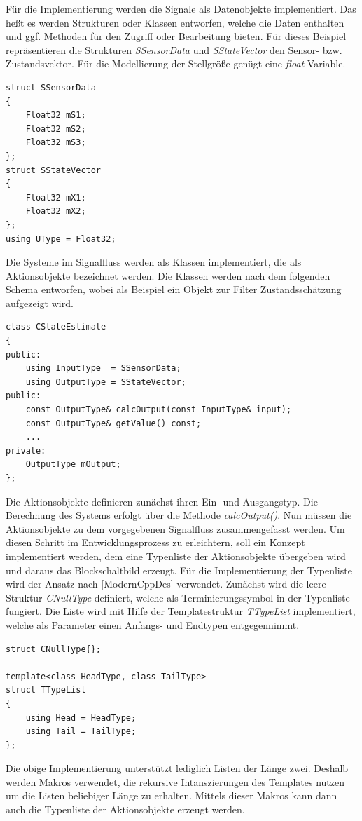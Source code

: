 Für die Implementierung werden die Signale als Datenobjekte implementiert. Das heßt es werden Strukturen oder Klassen entworfen, welche die Daten enthalten und ggf. Methoden für den Zugriff oder Bearbeitung bieten. Für dieses Beispiel repräsentieren die Strukturen \textit{SSensorData} und \textit{SStateVector} den Sensor- bzw. Zustandsvektor. Für die Modellierung der Stellgröße genügt eine \textit{float}-Variable.
\begin{lstlisting}[caption={Beispielhafte Implementierung eines Datenobjektes},captionpos=b]
struct SSensorData
{
	Float32 mS1;
	Float32 mS2;
	Float32 mS3;
};
struct SStateVector
{
	Float32 mX1;
	Float32 mX2;
};
using UType = Float32;
\end{lstlisting}
Die Systeme im Signalfluss werden als Klassen implementiert, die als Aktionsobjekte bezeichnet werden. Die Klassen werden nach dem folgenden Schema entworfen, wobei als Beispiel ein Objekt zur Filter Zustandsschätzung aufgezeigt wird.
\begin{lstlisting}[caption={Beispielhafte Implementierung eines Aktionsobjektes},captionpos=b]
class CStateEstimate
{
public:
	using InputType	 = SSensorData;
	using OutputType = SStateVector;
public:
	const OutputType& calcOutput(const InputType& input);
	const OutputType& getValue() const;
	...
private:	 
	OutputType mOutput;
};
\end{lstlisting}
Die Aktionsobjekte definieren zunächst ihren Ein- und Ausgangstyp. Die Berechnung des Systems erfolgt über die Methode \textit{calcOutput()}.
Nun müssen die Aktionsobjekte zu dem vorgegebenen Signalfluss zusammengefasst werden. Um diesen Schritt im Entwicklungsprozess zu erleichtern, soll ein Konzept implementiert werden, dem eine Typenliste der Aktionsobjekte übergeben wird und daraus das Blockschaltbild erzeugt.
Für die Implementierung der Typenliste wird der Ansatz nach [ModernCppDes] verwendet. Zunächst wird die leere Struktur \textit{CNullType} definiert, welche als Terminierungssymbol in der Typenliste fungiert. Die Liste wird mit Hilfe der Templatestruktur \textit{TTypeList} implementiert, welche als Parameter einen Anfangs- und Endtypen entgegennimmt.
\begin{lstlisting}[caption={Implementierung der Typenlist},captionpos=b]
struct CNullType{};

template<class HeadType, class TailType>
struct TTypeList
{
	using Head = HeadType;
	using Tail = TailType;
};
\end{lstlisting}
Die obige Implementierung unterstützt lediglich Listen der Länge zwei. Deshalb werden Makros verwendet, die rekursive Intanszierungen des Templates nutzen um die Listen beliebiger Länge zu erhalten. Mittels dieser Makros kann dann auch die Typenliste der Aktionsobjekte erzeugt werden.
